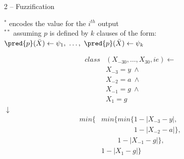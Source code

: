 \documentclass[presentation]{beamer}\mode<presentation>{\usetheme{AMSBolognaFC}}
\begin{document}

\begin{frame}{2 -- Fuzzification}
    
    \begin{minipage}{0.6\textwidth}
        
        
        \begin{center}\scriptsize
            $^{*}$ encodes the value for the $i^{th}$ output
            \\
            \smallskip
            $^{**}$ assuming $p$ is defined by $k$ clauses of the form:
            \\
            $\pred{p}(\bar{X}) \leftarrow \psi_1,\ \ldots,\ \pred{p}(\bar{X}) \leftarrow \psi_k$
        \end{center}
    \end{minipage}
    \begin{minipage}{0.35\textwidth}
        \begin{equation*}
            \begin{split}
                class&(X_{-30}, \dots, X_{30}, ie) \leftarrow\\
                &X_{-3} = y\ \wedge\\
                &X_{-2} = a\ \wedge\\
                &X_{-1} = g\ \wedge\\
                &X_{1} = g
            \end{split}
        \end{equation*}
        \centering
        $\downarrow$
        \begin{equation*}
            \begin{split}
                min\{&min\{min\{1-|X_{-3} - y|,\\
                &\phantom{min\{min\{}1-|X_{-2} - a|\},\\
                &\phantom{min\{}1-|X_{-1} - g|\},\\
                &1-|X_{1}-g|\}
            \end{split}
        \end{equation*}
    \end{minipage}
    
\end{frame}
\end{document}
